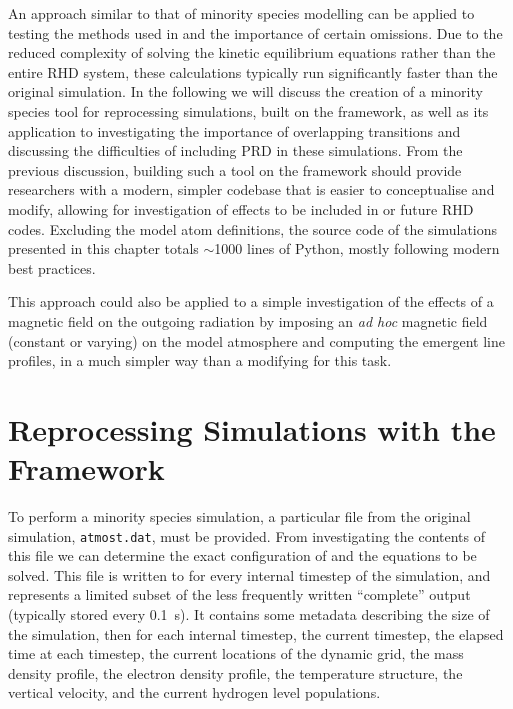 An approach similar to that of minority species modelling can be applied to testing the methods used in \Radyn{} and the importance of certain omissions.
Due to the reduced complexity of solving the kinetic equilibrium equations rather than the entire RHD system, these calculations typically run significantly faster than the original simulation.
In the following we will discuss the creation of a minority species tool for reprocessing \Radyn{} simulations, built on the \Lw{} framework, as well as its application to investigating the importance of overlapping transitions and discussing the difficulties of including PRD in these simulations.
From the previous discussion, building such a tool on the \Lw{} framework should provide researchers with a modern, simpler codebase that is easier to conceptualise and modify, allowing for investigation of effects to be included in \Radyn{} or future RHD codes.
Excluding the model atom definitions, the source code of the simulations presented in this chapter totals $\sim$1000 lines of Python, mostly following modern best practices.

This approach could also be applied to a simple investigation of the effects of a magnetic field on the outgoing radiation by imposing an \emph{ad hoc} magnetic field (constant or varying) on the model atmosphere and computing the emergent line profiles, in a much simpler way than a modifying \Radyn{} for this task.

\section{Reprocessing \Radyn{} Simulations with the \Lw{} Framework}

To perform a minority species simulation, a particular file from the original simulation, \texttt{atmost.dat}, must be provided.
From investigating the contents of this file we can determine the exact configuration of \Lw{} and the equations to be solved.
This file is written to for every internal timestep of the \Radyn{} simulation, and represents a limited subset of the less frequently written ``complete'' output (typically stored every \SI{0.1}{\second}).
It contains some metadata describing the size of the simulation, then for each internal timestep, the current timestep, the elapsed time at each timestep, the current locations of the dynamic grid, the mass density profile, the electron density profile, the temperature structure, the vertical velocity, and the current hydrogen level populations.

